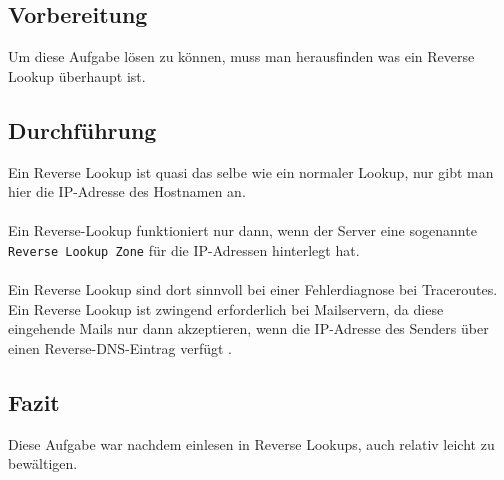 \subsection{Vorbereitung}
Um diese Aufgabe lösen zu können, muss man herausfinden was ein Reverse Lookup überhaupt ist.

\subsection{Durchführung}
Ein Reverse Lookup ist quasi das selbe wie ein normaler Lookup, nur gibt man hier die IP-Adresse des Hostnamen an. \\\\Ein Reverse-Lookup funktioniert nur dann, wenn der Server eine sogenannte \texttt{Reverse Lookup Zone} für die IP-Adressen hinterlegt hat. \\\\Ein Reverse Lookup sind dort sinnvoll bei einer Fehlerdiagnose bei Traceroutes. Ein Reverse Lookup ist zwingend erforderlich bei Mailservern, da diese eingehende Mails nur dann akzeptieren, wenn die IP-Adresse des Senders über einen Reverse-DNS-Eintrag verfügt \cite{dns}.

\subsection{Fazit}
Diese Aufgabe war nachdem einlesen in Reverse Lookups, auch relativ leicht zu bewältigen.

